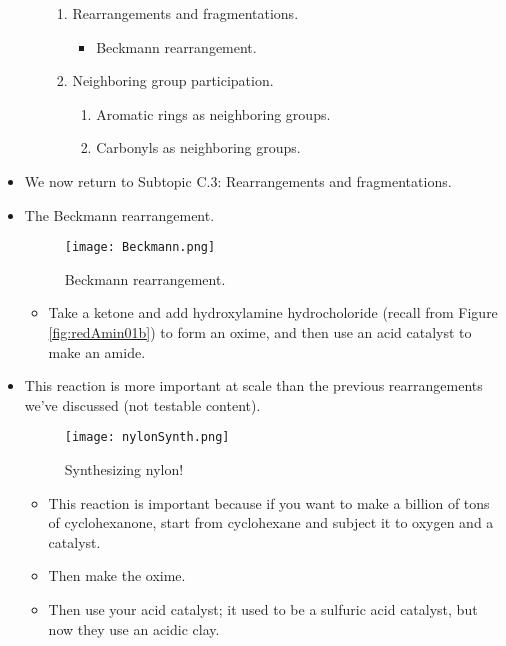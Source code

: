 \documentclass[../notes.tex]{subfiles}
\begin{document}
\begin{itemize}
\begin{enumerate}[label={\Alph*.},start=3]
\begin{enumerate}[label={\arabic*)},start=3]
            \item Rearrangements and fragmentations.
            \begin{itemize}
                \item Beckmann rearrangement.
            \end{itemize}
            \item Neighboring group participation.
            \begin{enumerate}[label={\alph*)}]
                \item Aromatic rings as neighboring groups.
                \item Carbonyls as neighboring groups.
            \end{enumerate}
        \end{enumerate}
    \end{enumerate}
    \item We now return to Subtopic C.3: Rearrangements and fragmentations.
    \item The Beckmann rearrangement.
    \begin{figure}[h!]
        \centering
        \texttt{[image: Beckmann.png]}
        \caption{Beckmann rearrangement.}
        \label{fig:Beckmann}
    \end{figure}
    \begin{itemize}
        \item Take a ketone and add hydroxylamine hydrocholoride (recall from Figure \ref{fig:redAmin01b}) to form an oxime, and then use an acid catalyst to make an amide.
    \end{itemize}
    \item This reaction is more important at scale than the previous rearrangements we've discussed (not testable content).
    \begin{figure}[H]
        \centering
        \texttt{[image: nylonSynth.png]}
        \caption{Synthesizing nylon!}
        \label{fig:nylonSynth}
    \end{figure}
    \begin{itemize}
        \item This reaction is important because if you want to make a billion of tons of cyclohexanone, start from cyclohexane and subject it to oxygen and a catalyst.
        \item Then make the oxime.
        \item Then use your acid catalyst; it used to be a sulfuric acid catalyst, but now they use an acidic clay.

\end{itemize}
\end{itemize}
\end{document}
